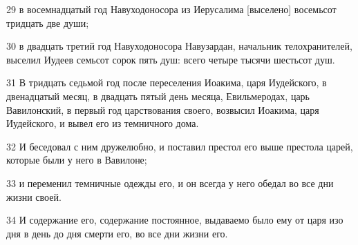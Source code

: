 \par 29 в восемнадцатый год Навуходоносора из Иерусалима [выселено] восемьсот тридцать две души;
\par 30 в двадцать третий год Навуходоносора Навузардан, начальник телохранителей, выселил Иудеев семьсот сорок пять душ: всего четыре тысячи шестьсот душ.
\par 31 В тридцать седьмой год после переселения Иоакима, царя Иудейского, в двенадцатый месяц, в двадцать пятый день месяца, Евильмеродах, царь Вавилонский, в первый год царствования своего, возвысил Иоакима, царя Иудейского, и вывел его из темничного дома.
\par 32 И беседовал с ним дружелюбно, и поставил престол его выше престола царей, которые были у него в Вавилоне;
\par 33 и переменил темничные одежды его, и он всегда у него обедал во все дни жизни своей.
\par 34 И содержание его, содержание постоянное, выдаваемо было ему от царя изо дня в день до дня смерти его, во все дни жизни его.


